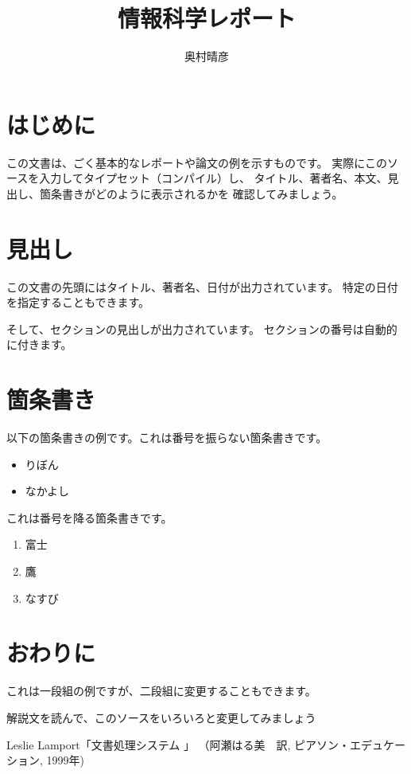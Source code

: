 \documentclass{jsarticle}
\begin{document}
\title{情報科学レポート}
\author{奥村晴彦}
\maketitle

\section{はじめに}

この文書は、ごく基本的なレポートや論文の例を示すものです。
実際にこのソースを入力してタイプセット（コンパイル）し、
タイトル、著者名、本文、見出し、箇条書きがどのように表示されるかを
確認してみましょう。

\section{見出し}

この文書の先頭にはタイトル、著者名、日付が出力されています。
特定の日付を指定することもできます。

そして、セクションの見出しが出力されています。
セクションの番号は自動的に付きます。

\section{箇条書き}

以下の箇条書きの例です。これは番号を振らない箇条書きです。

\begin{itemize}
  \item りぼん
  \item なかよし
\end{itemize}

これは番号を降る箇条書きです。

\begin{enumerate}
  \item 富士
  \item 鷹
  \item なすび
\end{enumerate}

\section{おわりに}

これは一段組の例ですが、二段組に変更することもできます。

解説文を読んで、このソースをいろいろと変更してみましょう

\begin{thebibliography}{99}
\item
  Leslie Lamport「文書処理システム \LaTeXe」
  （阿瀬はる美　訳, ピアソン・エデュケーション, 1999年)
\end{thebibliography}
\end{document}
